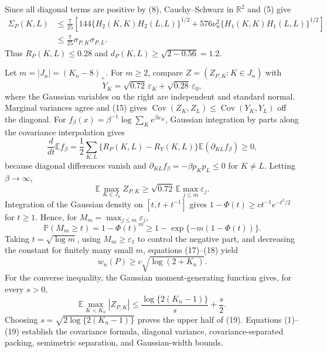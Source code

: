 Since all diagonal terms are positive by (8), Cauchy--Schwarz in \(\mathbb R^2\) and (5) give
\[
 \begin{aligned}
 \Sigma_P(K,L)
 &\leq\frac7{25}\left[144\{H_2(K,K)H_2(L,L)\}^{1/2}
 +576\nu_n^2\{H_1(K,K)H_1(L,L)\}^{1/2}\right]\\
 &\leq\frac7{25}\sigma_{P,K}\sigma_{P,L}.
 \end{aligned}                                                               \tag{15}
\]
Thus \(R_P(K,L)\leq0.28\) and \(d_P(K,L)\geq\sqrt{2-0.56}=1.2\).

Let \(m=|J_n|=(K_n-8)_+\).  For \(m\geq2\), compare \(Z=(Z_{P,K}:K\in J_n)\) with
\[
 Y_K=\sqrt{0.72}\,\varepsilon_K+\sqrt{0.28}\,\varepsilon_0,
\]
where the Gaussian variables on the right are independent and standard normal.  Marginal variances agree and (15) gives \(\operatorname{Cov}(Z_K,Z_L)\leq\operatorname{Cov}(Y_K,Y_L)\) off the diagonal.  For
\(f_\beta(x)=\beta^{-1}\log\sum_Ke^{\beta x_K}\), Gaussian integration by parts along the covariance interpolation gives
\[
 \frac d{dt}\mathbb Ef_\beta
 =\frac12\sum_{K,L}\{R_P(K,L)-R_Y(K,L)\}\mathbb E(\partial_{KL}f_\beta)\geq0, \tag{16}
\]
because diagonal differences vanish and \(\partial_{KL}f_\beta=-\beta p_Kp_L\leq0\) for \(K\neq L\).  Letting \(\beta\to\infty\),
\[
 \mathbb E\max_{K\in J_n}Z_{P,K}
 \geq\sqrt{0.72}\,\mathbb E\max_{j\leq m}\varepsilon_j.                \tag{17}
\]
Integration of the Gaussian density on \([t,t+t^{-1}]\) gives
\(1-\Phi(t)\geq ct^{-1}e^{-t^2/2}\) for \(t\geq1\).  Hence, for \(M_m=\max_{j\leq m}\varepsilon_j\),
\[
 \mathbb P(M_m\geq t)=1-\Phi(t)^m
 \geq1-\exp\{-m(1-\Phi(t))\}.                                           \tag{18}
\]
Taking \(t=\sqrt{\log m}\), using \(M_m\geq\varepsilon_1\) to control the negative part, and decreasing the constant for finitely many small \(m\), equations (17)--(18) yield
\[
 w_n(P)\geq c\sqrt{\log(2+K_n)}.                                        \tag{19}
\]
For the converse inequality, the Gaussian moment-generating function gives, for every \(s>0\),
\[
 \mathbb E\max_{K<K_n}|Z_{P,K}|
 \leq\frac{\log\{2(K_n-1)\}}s+\frac s2.
\]
Choosing \(s=\sqrt{2\log\{2(K_n-1)\}}\) proves the upper half of (19).  Equations (1)--(19) establish the covariance formula, diagonal variance, covariance-separated packing, semimetric separation, and Gaussian-width bounds.